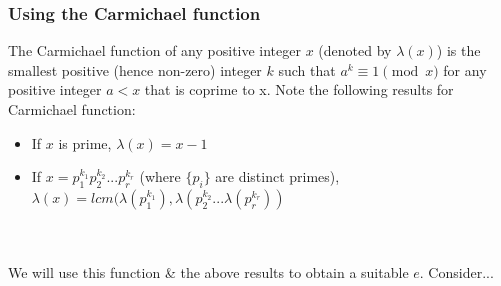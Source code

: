 \subsubsection{Using the Carmichael function}
The Carmichael function of any positive integer $x$ (denoted by $\lambda(x)$) is the smallest positive (hence non-zero) integer $k$ such that $a^k \equiv 1 \pmod x$ for any positive integer $a<x$ that is coprime to x.  Note the following results for Carmichael function:

\begin{itemize}
	\item If $x$ is prime, $\lambda(x)=x-1$
	\item If $x=p_1^{k_1}p_2^{k_2}...p_r^{k_r}$ (where $\{p_i\}$ are distinct primes),\\$\lambda(x)=lcm(\lambda(p_1^{k_1}),\lambda(p_2^{k_2}...\lambda(p_r^{k_r}))$
\end{itemize}
\\~\\
We will use this function \& the above results to obtain a suitable $e$.
Consider...

